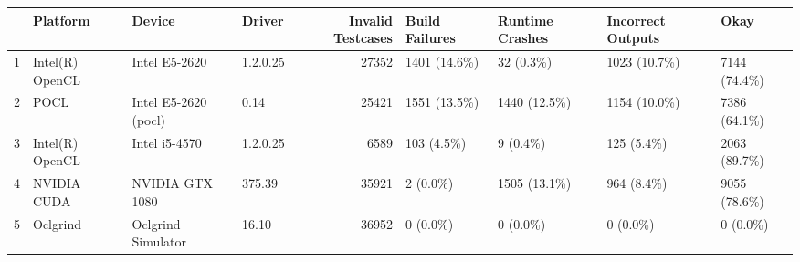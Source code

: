 \begin{tabular}{llllrllll}
\toprule
{} &         Platform &                Device &    Driver &  Invalid Testcases & Build Failures & Runtime Crashes & Incorrect Outputs &           Okay \\
\midrule
1 &  Intel(R) OpenCL &         Intel E5-2620 &  1.2.0.25 &              27352 &  1401  (14.6\%) &      32  (0.3\%) &     1023  (10.7\%) &  7144  (74.4\%) \\
2 &             POCL &  Intel E5-2620 (pocl) &      0.14 &              25421 &  1551  (13.5\%) &   1440  (12.5\%) &     1154  (10.0\%) &  7386  (64.1\%) \\
3 &  Intel(R) OpenCL &         Intel i5-4570 &  1.2.0.25 &               6589 &    103  (4.5\%) &       9  (0.4\%) &       125  (5.4\%) &  2063  (89.7\%) \\
4 &      NVIDIA CUDA &       NVIDIA GTX 1080 &    375.39 &              35921 &      2  (0.0\%) &   1505  (13.1\%) &       964  (8.4\%) &  9055  (78.6\%) \\
5 &         Oclgrind &    Oclgrind Simulator &     16.10 &              36952 &      0  (0.0\%) &       0  (0.0\%) &         0  (0.0\%) &      0  (0.0\%) \\
\bottomrule
\end{tabular}
